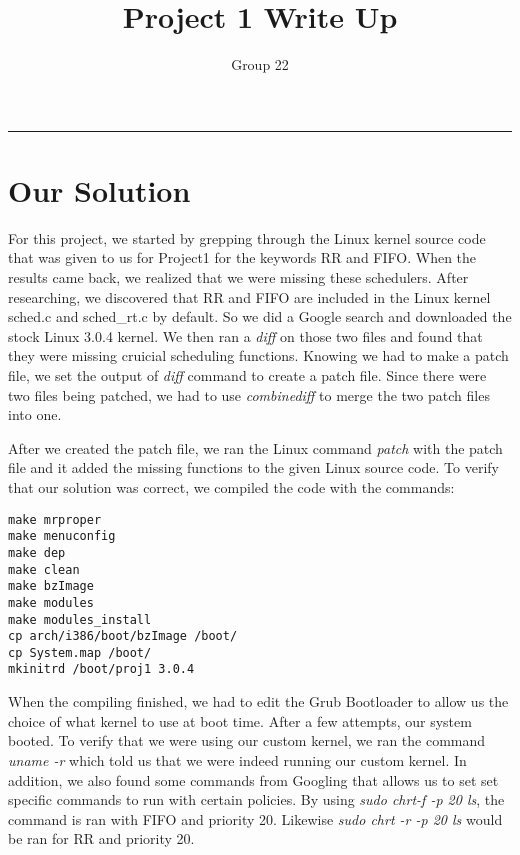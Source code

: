\documentclass[letterpaper,10pt,notitlepage,fleqn]{article}
\title{Project 1 Write Up}
\author{Group 22}
\begin{document}
\maketitle
\hrule

\section*{Our Solution}
For this project, we started by grepping through the Linux kernel source code that was given to us for Project1 for the keywords RR and FIFO. When the results came back, we realized that we were missing these schedulers. After researching, we discovered that RR and FIFO are included in the Linux kernel sched.c and sched\_rt.c by default. So we did a Google search and downloaded the stock Linux 3.0.4 kernel. We then ran a \textit{diff} on those two files and found that they were missing
cruicial scheduling functions. Knowing we had to make a patch file, we set the output of \textit{diff} command to create a patch file. Since there were two files being patched, we had to use \textit{combinediff} to merge the two patch files into one. 

After we created the patch file, we ran the Linux command \textit{patch} with the patch file and it added the missing functions to the given Linux source code. To verify that our solution was correct, we compiled the code with the commands: 

\begin{verbatim}make mrproper
make menuconfig
make dep
make clean
make bzImage
make modules
make modules_install
cp arch/i386/boot/bzImage /boot/
cp System.map /boot/
mkinitrd /boot/proj1 3.0.4
\end{verbatim}

When the compiling finished, we had to edit the Grub Bootloader to allow us the choice of what kernel to use at boot time. After a few attempts, our system booted. To verify that we were using our custom kernel, we ran the command \textit{uname -r} which told us that we were indeed running our custom kernel. In addition, we also found some commands from Googling that allows us to set set specific commands to run with certain policies. By using \textit{sudo chrt-f -p 20 ls}, the command is ran with FIFO and priority 20. Likewise \textit{sudo chrt -r -p 20 ls} would be ran for RR and priority 20.   
\end{document}
